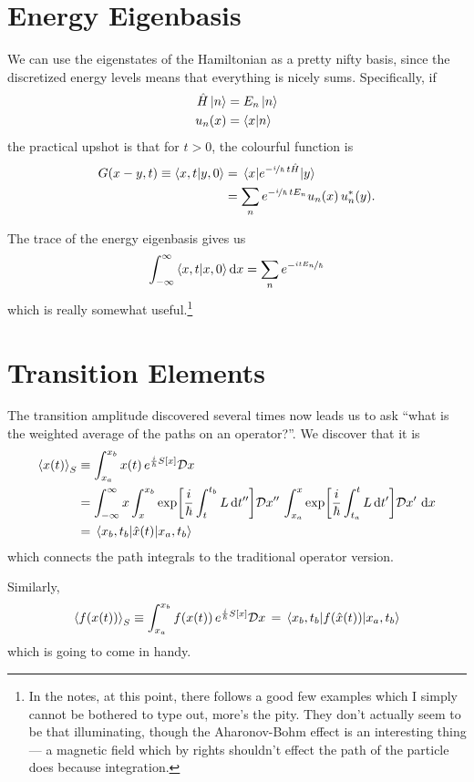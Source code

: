 \documentclass[]{revision-notes}
\begin{document}
\section{Energy Eigenbasis}
We can use the eigenstates of the Hamiltonian as a pretty nifty basis, since the discretized energy levels means that everything is nicely sums. Specifically, if
\begin{align*}
  \hat{H}\ket{n} &= E_n\ket{n}\\
  u_n(x) &= \braket{x}{n}
\end{align*}
the practical upshot is that for \(t > 0 \), the colourful function is
\begin{align*}
  G(x-y, t) \equiv \braket{x, t}{y, 0} &= \mel{x}{e^{-\nicefrac{i}{\hbar}\,t \hat{H}}}{y}\\
  &= \sum_n e^{-\nicefrac{i}{\hbar}\,t E_n} u_n(x)\,u_n^\ast(y).
\end{align*}

The trace of the energy eigenbasis gives us \[ \int_{-\infty}^{\infty} \braket{x,t}{x,0} \dd{x} = \sum_n e^{-\nicefrac{itE_n}{\hbar}} \] which is really somewhat useful.\footnote{In the notes, at this point, there follows a good few examples which I simply cannot be bothered to type out, more's the pity. They don't actually seem to be that illuminating, though the Aharonov-Bohm effect is an interesting thing --- a magnetic field which by rights shouldn't effect the path of the particle does because integration.}

\section{Transition Elements}
The transition amplitude discovered several times now leads us to ask ``what is the weighted average of the paths on an operator?''.
We discover that it is
\begin{align*}
  \ev{x(t)}_S &\equiv \int_{x_a}^{x_b} x(t) \, e^{\frac{i}{\hbar} S[x]} \DD{x}\\
  &= \int_{-\infty}^\infty x \int_x^{x_b} \exp[\frac{i}{\hbar} \int_t^{t_b} L \dd{t^{\prime\prime}}]\DD{x^{\prime\prime}} \int^x_{x_a}\exp[\frac{i}{\hbar} \int^t_{t_a} L \dd{t^{\prime}}]\DD{x^{\prime}}\dd{x}\\
  &= \mel{x_b, t_b}{\hat{x}(t)}{x_a, t_b}
\end{align*}
which connects the path integrals to the traditional operator version.

Similarly, \[ \ev{f(x(t))}_S \equiv \int_{x_a}^{x_b} f(x(t))\, e^{\frac{i}{\hbar} S[x]} \DD{x} = \mel{x_b, t_b}{f(\hat{x}(t))}{x_a, t_b}\]
which is going to come in handy.
\end{document}
